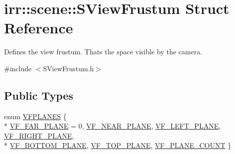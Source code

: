 \hypertarget{structirr_1_1scene_1_1SViewFrustum}{}\section{irr\+:\+:scene\+:\+:S\+View\+Frustum Struct Reference}
\label{structirr_1_1scene_1_1SViewFrustum}


Defines the view frustum. That\textquotesingle{}s the space visible by the camera.  




{\ttfamily \#include $<$S\+View\+Frustum.\+h$>$}

\subsection*{Public Types}
\begin{DoxyCompactItemize}
\item 
enum \hyperlink{structirr_1_1scene_1_1SViewFrustum_ae3a96797aec028717f0589e82926b9f0}{V\+F\+P\+L\+A\+N\+ES} \{ \\*
\hyperlink{structirr_1_1scene_1_1SViewFrustum_ae3a96797aec028717f0589e82926b9f0a33c11636c0cf3a29df16551fb3222f89}{V\+F\+\_\+\+F\+A\+R\+\_\+\+P\+L\+A\+NE} = 0, 
\hyperlink{structirr_1_1scene_1_1SViewFrustum_ae3a96797aec028717f0589e82926b9f0ad4e37002c2f3f5c9aa7219ca74ffb48e}{V\+F\+\_\+\+N\+E\+A\+R\+\_\+\+P\+L\+A\+NE}, 
\hyperlink{structirr_1_1scene_1_1SViewFrustum_ae3a96797aec028717f0589e82926b9f0a4d611f15cd215819287e533b45715d5c}{V\+F\+\_\+\+L\+E\+F\+T\+\_\+\+P\+L\+A\+NE}, 
\hyperlink{structirr_1_1scene_1_1SViewFrustum_ae3a96797aec028717f0589e82926b9f0acc02c8b170e35f1416f1511646b051aa}{V\+F\+\_\+\+R\+I\+G\+H\+T\+\_\+\+P\+L\+A\+NE}, 
\\*
\hyperlink{structirr_1_1scene_1_1SViewFrustum_ae3a96797aec028717f0589e82926b9f0aa230be71193da774ddcb735ec7b10dd1}{V\+F\+\_\+\+B\+O\+T\+T\+O\+M\+\_\+\+P\+L\+A\+NE}, 
\hyperlink{structirr_1_1scene_1_1SViewFrustum_ae3a96797aec028717f0589e82926b9f0adc6f550cf3890b19837cd8f0d7b1020a}{V\+F\+\_\+\+T\+O\+P\+\_\+\+P\+L\+A\+NE}, 
\hyperlink{structirr_1_1scene_1_1SViewFrustum_ae3a96797aec028717f0589e82926b9f0a6c3c4cb8060a23a2365cf1df46fcefd7}{V\+F\+\_\+\+P\+L\+A\+N\+E\+\_\+\+C\+O\+U\+NT}
 \}
\end{DoxyCompactItemize}
